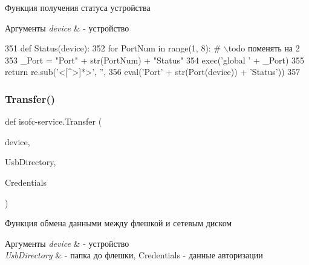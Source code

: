Функция получения статуса устройства 


\begin{DoxyParams}{Аргументы}
{\em device} & -\/ устройство \\
\hline
\end{DoxyParams}

\begin{DoxyCode}
351 \textcolor{keyword}{def }Status(device):
352     \textcolor{keywordflow}{for} PortNum \textcolor{keywordflow}{in} range(1, 8): \textcolor{comment}{# \(\backslash\)todo поменять на 2}
353         \_Port = \textcolor{stringliteral}{"Port"} + str(PortNum) + \textcolor{stringliteral}{"Status"}
354         exec(\textcolor{stringliteral}{'global '} + \_Port)
355     \textcolor{keywordflow}{return} re.sub(\textcolor{stringliteral}{'<[^>]*>'}, \textcolor{stringliteral}{''},
356                  eval(\textcolor{stringliteral}{'Port'} + str(Port(device)) + \textcolor{stringliteral}{'Status'}))
357 
\end{DoxyCode}
\mbox{\label{isofc-service_8py_file_ac3a9b4525481c6bc4b39f8c382294cf3}} 
\subsubsection{\texorpdfstring{Transfer()}{Transfer()}}
{\footnotesize\ttfamily def isofc-\/service.\+Transfer (\begin{DoxyParamCaption}\item[{}]{device,  }\item[{}]{Usb\+Directory,  }\item[{}]{Credentials }\end{DoxyParamCaption})}



Функция обмена данными между флешкой и сетевым диском 


\begin{DoxyParams}{Аргументы}
{\em device} & -\/ устройство \\
\hline
{\em Usb\+Directory} & -\/ папка до флешки, Credentials -\/ данные авторизации \\
\hline
\end{DoxyParams}

